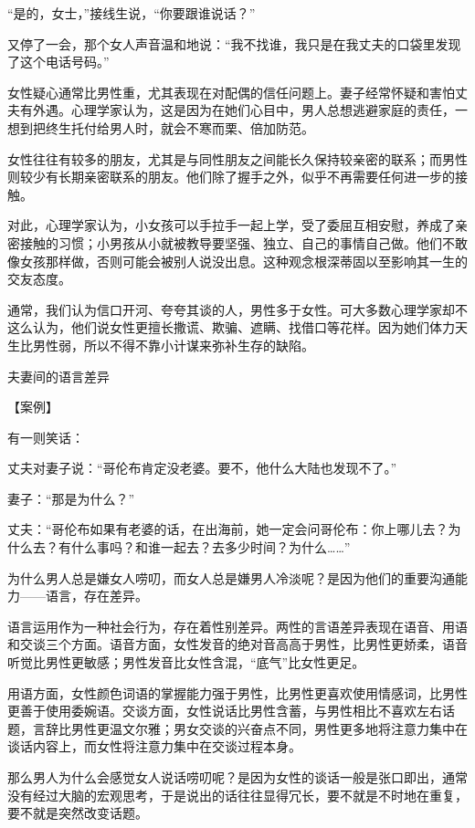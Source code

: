 \documentclass[12pt,UTF8]{ctexbook}
\begin{document}
“是的，女士，”接线生说，“你要跟谁说话？”

又停了一会，那个女人声音温和地说：“我不找谁，我只是在我丈夫的口袋里发现了这个电话号码。”

女性疑心通常比男性重，尤其表现在对配偶的信任问题上。妻子经常怀疑和害怕丈夫有外遇。心理学家认为，这是因为在她们心目中，男人总想逃避家庭的责任，一想到把终生托付给男人时，就会不寒而栗、倍加防范。

女性往往有较多的朋友，尤其是与同性朋友之间能长久保持较亲密的联系；而男性则较少有长期亲密联系的朋友。他们除了握手之外，似乎不再需要任何进一步的接触。

对此，心理学家认为，小女孩可以手拉手一起上学，受了委屈互相安慰，养成了亲密接触的习惯；小男孩从小就被教导要坚强、独立、自己的事情自己做。他们不敢像女孩那样做，否则可能会被别人说没出息。这种观念根深蒂固以至影响其一生的交友态度。

通常，我们认为信口开河、夸夸其谈的人，男性多于女性。可大多数心理学家却不这么认为，他们说女性更擅长撒谎、欺骗、遮瞒、找借口等花样。因为她们体力天生比男性弱，所以不得不靠小计谋来弥补生存的缺陷。





夫妻间的语言差异


【案例】

有一则笑话：

丈夫对妻子说：“哥伦布肯定没老婆。要不，他什么大陆也发现不了。”

妻子：“那是为什么？”

丈夫：“哥伦布如果有老婆的话，在出海前，她一定会问哥伦布：你上哪儿去？为什么去？有什么事吗？和谁一起去？去多少时间？为什么……”

为什么男人总是嫌女人唠叨，而女人总是嫌男人冷淡呢？是因为他们的重要沟通能力——语言，存在差异。

语言运用作为一种社会行为，存在着性别差异。两性的言语差异表现在语音、用语和交谈三个方面。语音方面，女性发音的绝对音高高于男性，比男性更娇柔，语音听觉比男性更敏感；男性发音比女性含混，“底气”比女性更足。

用语方面，女性颜色词语的掌握能力强于男性，比男性更喜欢使用情感词，比男性更善于使用委婉语。交谈方面，女性说话比男性含蓄，与男性相比不喜欢左右话题，言辞比男性更温文尔雅；男女交谈的兴奋点不同，男性更多地将注意力集中在谈话内容上，而女性将注意力集中在交谈过程本身。

那么男人为什么会感觉女人说话唠叨呢？是因为女性的谈话一般是张口即出，通常没有经过大脑的宏观思考，于是说出的话往往显得冗长，要不就是不时地在重复，要不就是突然改变话题。
\end{document}
